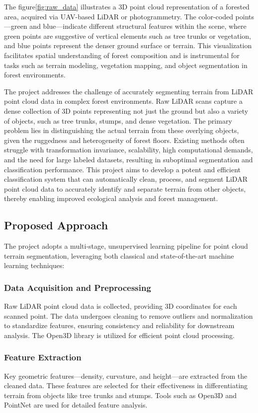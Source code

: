\documentclass[../report.tex]{subfiles}
\begin{document}
The figure\ref{fig:raw_data} illustrates a 3D point cloud representation of a forested area, acquired via UAV-based LiDAR or photogrammetry. The color-coded points—green and blue—indicate different structural features within the scene, where green points are suggestive of vertical elements such as tree trunks or vegetation, and blue points represent the denser ground surface or terrain. This visualization facilitates spatial understanding of forest composition and is instrumental for tasks such as terrain modeling, vegetation mapping, and object segmentation in forest environments.
    
The project addresses the challenge of accurately segmenting terrain from LiDAR point cloud data in complex forest environments. Raw LiDAR scans capture a dense collection of 3D points representing not just the ground but also a variety of objects, such as tree trunks, stumps, and dense vegetation. The primary problem lies in distinguishing the actual terrain from these overlying objects, given the ruggedness and heterogeneity of forest floors. Existing methods often struggle with transformation invariance, scalability, high computational demands, and the need for large labeled datasets, resulting in suboptimal segmentation and classification performance. This project aims to develop a potent and efficient classification system that can automatically clean, process, and segment LiDAR point cloud data to accurately identify and separate terrain from other objects, thereby enabling improved ecological analysis and forest management.
    \subsection{Proposed Approach}
    
    \label{sec:introduction:proposed_approach}
The project adopts a multi-stage, unsupervised learning pipeline for point cloud terrain segmentation, leveraging both classical and state-of-the-art machine learning techniques:
\subsubsection{Data Acquisition and Preprocessing}
Raw LiDAR point cloud data is collected, providing 3D coordinates for each scanned point. The data undergoes cleaning to remove outliers and normalization to standardize features, ensuring consistency and reliability for downstream analysis. The Open3D library is utilized for efficient point cloud processing.
\subsubsection{Feature Extraction}
Key geometric features—density, curvature, and height—are extracted from the cleaned data. These features are selected for their effectiveness in differentiating terrain from objects like tree trunks and stumps. Tools such as Open3D\cite{Open3D_Library} and PointNet\cite{PointNet} are used for detailed feature analysis.
\end{document}
